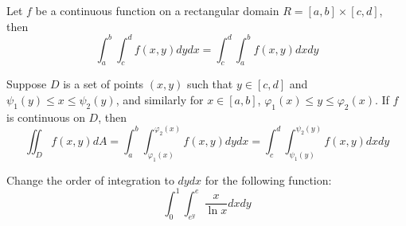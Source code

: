 \documentclass[openany]{book}
\begin{document}
\begin{prop}
    Let $f$ be a continuous function on a rectangular domain $R=[a,b]\times[c,d]$, then 
    \begin{equation*}
        \int_a^b\int_c^df(x,y)dydx=\int_c^d\int_a^bf(x,y)dxdy
    \end{equation*}
\end{prop}

\begin{prop}
    Suppose $D$ is a set of points $(x,y)$ such that $y\in [c,d]$ and $\psi_1(y)\leq x\leq\psi_2(y)$, and similarly for $x\in [a,b]$, $\varphi_1(x)\leq y\leq\varphi_2(x)$. If $f$ is continuous on $D$, then 
    \begin{equation*}
        \iint_Df(x,y)dA=\int_a^b\int_{\varphi_1(x)}^{\varphi_2(x)}f(x,y)dydx=\int_c^d\int_{\psi_1(y)}^{\psi_2(y)}f(x,y)dxdy
    \end{equation*}
\end{prop}

\begin{prob}
    Change the order of integration to $dydx$ for the following function:
    \begin{equation*}
        \int_0^1\int_{e^y}^{e}\frac{x}{\ln x}dxdy
    \end{equation*}
\end{prob}
\end{document}
